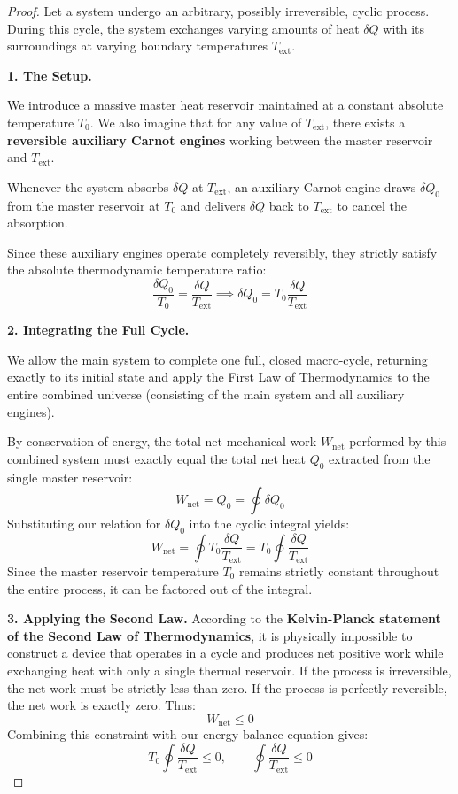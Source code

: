 \begin{proof}
Let a system undergo an arbitrary, possibly irreversible, cyclic process. 
During this cycle, the system exchanges varying amounts of heat $\delta Q$ with its surroundings at varying boundary temperatures $T_{\text{ext}}$.

\textbf{1. The Setup.}

We introduce a massive master heat reservoir maintained at a constant absolute temperature $T_0$. 
We also imagine that for any value of $T_{\text{ext}}$, there exists a \textbf{reversible auxiliary Carnot engines} working between 
the master reservoir and $T_{\text{ext}}$.   

Whenever the system absorbs $\delta Q$ at $T_{\text{ext}}$, an auxiliary Carnot engine draws  $\delta Q_0$ from the master reservoir 
at $T_0$ and delivers $\delta Q$ back to $T_{\text{ext}}$ to cancel the absorption. 

Since these auxiliary engines operate completely reversibly, they strictly satisfy the absolute thermodynamic temperature ratio:
\[
\frac{\delta Q_0}{T_0} = \frac{\delta Q}{T_{\text{ext}}} \implies \delta Q_0 = T_0 \frac{\delta Q}{T_{\text{ext}}}
\]

\textbf{2. Integrating the Full Cycle.}

We allow the main system to complete one full, closed macro-cycle, returning exactly to its initial state and 
apply the First Law of Thermodynamics to the entire combined universe (consisting of the main system and all auxiliary engines). 

By conservation of energy, the total net mechanical work $W_{\text{net}}$ performed by this combined system 
must exactly equal the total net heat $Q_0$ extracted from the single master reservoir:
\[
W_{\text{net}} = Q_0 = \oint \delta Q_0
\]
Substituting our relation for $\delta Q_0$ into the cyclic integral yields:
\[
W_{\text{net}} = \oint T_0 \frac{\delta Q}{T_{\text{ext}}}= T_0 \oint \frac{\delta Q}{T_{\text{ext}}}
\]
Since the master reservoir temperature $T_0$ remains strictly constant throughout the entire process, it can be factored out of the integral. 

\textbf{3. Applying the Second Law.}  
According to the \textbf{Kelvin-Planck statement of the Second Law of Thermodynamics}, 
it is physically impossible to construct a device that operates in a cycle and produces net positive work while exchanging heat with only a single thermal reservoir. 
If the process is irreversible, the net work must be strictly less than zero. If the process is perfectly reversible, the net work is exactly zero. Thus:
\[
W_{\text{net}} \le 0
\]
Combining this constraint with our energy balance equation gives:
\[
T_0 \oint \frac{\delta Q}{T_{\text{ext}}} \le 0, \qquad \oint \frac{\delta Q}{T_{\text{ext}}} \le 0
\]
\end{proof}

